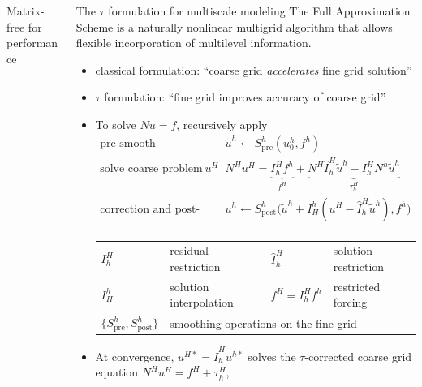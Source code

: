 \documentclass[final,t]{beamer}
\begin{document}
\begin{frame}{}
\begin{columns}
\begin{column}{0.31\textwidth}
\begin{block}{Matrix-free for performance}
\begin{table}
          \caption{Balanced arithmetic intensity (flops/byte) for several architectures.}\label{tab:BalancedAI}
        \end{table}
      \end{block}
    \end{column}
    \begin{column}{0.31\textwidth}
      \begin{block}{The $\tau$ formulation for multiscale modeling}
        The Full Approximation Scheme is a naturally nonlinear multigrid algorithm that allows flexible incorporation of multilevel information.
        \begin{itemize}
        \item classical formulation: ``coarse grid \emph{accelerates} fine grid solution''
        \item $\tau$ formulation: ``fine grid improves accuracy of coarse grid''
        \item To solve $N u = f$, recursively apply
          \begin{equation*}
            \begin{split}
              \text{pre-smooth} \:\: & \quad \tilde u^h \gets S^h_{\text{pre}}(u^h_0, f^h) \\
              \text{solve coarse problem for $u^H$} \:\: & \quad N^H u^H = \underbrace{I_h^H f^h}_{f^H} + \underbrace{N^H \hat I_h^H \tilde u^h - I_h^H N^h \tilde u^h}_{\tau_h^H} \\
              \text{correction and post-smooth} \:\: & \quad u^h \gets S^h_{\text{post}} \Big( \tilde u^h + I_H^h (u^H - \hat I_h^H \tilde u^h), f^h \Big) \\
            \end{split}
          \end{equation*}
          \begin{tabular}{llll}
            \toprule
            $I_h^H$ & residual restriction & $\hat I_h^H$ & solution restriction \\
            $I_H^h$ & solution interpolation & $f^H = I_h^H f^h$ & restricted forcing \\
            $\{S^h_{\text{pre}},S^h_{\text{post}}\}$ & \multicolumn{3}{l}{smoothing operations on the fine grid} \\
            \bottomrule
          \end{tabular}
        \item At convergence, $u^{H*} = \hat I_h^H u^{h*}$ solves the $\tau$-corrected coarse grid equation
            $N^H u^H = f^H + \tau_h^H$,

\end{itemize}
\end{block}
\end{column}
\end{columns}
\end{frame}
\end{document}
